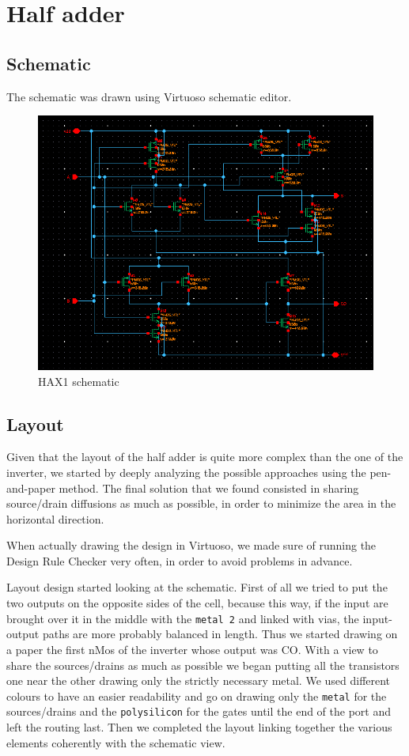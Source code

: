 \documentclass[a4paper]{article}
\begin{document}
\section{Half adder}
\subsection{Schematic}
The schematic was drawn using Virtuoso schematic editor.

\begin{figure}[H]
      \centering
       \includegraphics[width=12cm]{./Images/HA/HAX1_schematic.png}
\caption{HAX1 schematic}
\label{fig: HAX1_sch}
\end{figure}

\subsection{Layout}
Given that the layout of the half adder is quite more complex than the one of the inverter, we started by deeply analyzing the possible approaches using the pen-and-paper method. The final solution that we found consisted in sharing source/drain diffusions as much as possible, in order to minimize the area in the horizontal direction.

When actually drawing the design in Virtuoso, we made sure of running the Design Rule Checker very often, in order to avoid problems in advance.

Layout design started looking at the schematic. First of all we tried to put the two outputs on the opposite sides of the cell, because this way, if the input are brought over it in the middle with the \texttt{metal 2} and linked with vias, the input-output paths are more probably balanced in length. 
Thus we started drawing on a paper the first nMos of the inverter whose output was CO. With a view to share the sources/drains as much as possible we began putting all the transistors one near the other drawing only the strictly necessary metal.
We used different colours to have an easier readability and go on drawing only the \texttt{metal} for the sources/drains and the \texttt{polysilicon} for the gates until the end of the port and left the routing last. Then we completed the layout linking together the various elements coherently with the schematic view.
\end{document}
